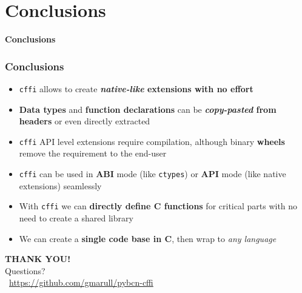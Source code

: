 \documentclass{beamer}
\begin{document}
\section{Conclusions}

\begin{frame}[plain]{}
  \begin{center}
    \Huge \textbf{Conclusions}
  \end{center}
\end{frame}

\begin{frame}
  \frametitle{Conclusions}

  \begin{itemize}
    \item<1-> \texttt{cffi} allows to create \textbf{\textit{native-like}
      extensions with no effort}
    \item<2-> \textbf{Data types} and \textbf{function declarations} can be
      \textbf{\textit{copy-pasted} from headers} or even directly extracted
    \item<3-> \texttt{cffi} API level extensions require compilation, although
      binary \textbf{wheels} remove the requirement to the end-user
    \item<4-> \texttt{cffi} can be used in \textbf{ABI} mode (like
      \texttt{ctypes}) or \textbf{API} mode (like native extensions) seamlessly
    \item<5-> With \texttt{cffi} we can \textbf{directly define C functions} for
      critical parts with no need to create a shared library
    \item<6-> We can create a \textbf{single code base in C}, then wrap to
      \textit{any language}
  \end{itemize}
\end{frame}

\begin{frame}[c]
  \begin{center}
    \huge
    \textbf{THANK YOU!} \\
    Questions? \\
    \vspace{2cm}
    \normalsize
    \faGithub~\href{https://github.com/gmarull/pybcn-cffi}{https://github.com/gmarull/pybcn-cffi}
  \end{center}
\end{frame}
\end{document}
